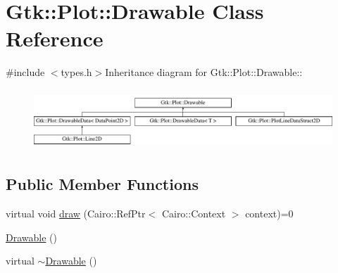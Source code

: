 \hypertarget{classGtk_1_1Plot_1_1Drawable}{
\section{Gtk::Plot::Drawable Class Reference}
\label{classGtk_1_1Plot_1_1Drawable}
}


{\ttfamily \#include $<$types.h$>$}Inheritance diagram for Gtk::Plot::Drawable::\begin{figure}[H]
\begin{center}
\leavevmode
\includegraphics[height=2.28571cm]{classGtk_1_1Plot_1_1Drawable}
\end{center}
\end{figure}
\subsection*{Public Member Functions}
\begin{DoxyCompactItemize}
\item 
virtual void \hyperlink{classGtk_1_1Plot_1_1Drawable_ab1c723fcea852515f17d933e66b63ed2}{draw} (Cairo::RefPtr$<$ Cairo::Context $>$ context)=0
\item 
\hyperlink{classGtk_1_1Plot_1_1Drawable_a22c799e2e10a3f7b60df8568f0d78f20}{Drawable} ()
\item 
virtual \hyperlink{classGtk_1_1Plot_1_1Drawable_abae99caef51e103d2160ef9a61ca08f9}{$\sim$Drawable} ()
\end{DoxyCompactItemize}



